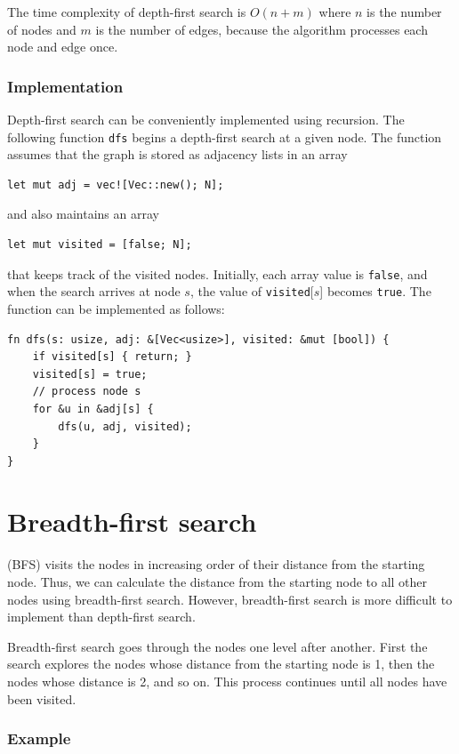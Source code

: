 The time complexity of depth-first search is $O(n+m)$
where $n$ is the number of nodes and $m$ is the
number of edges,
because the algorithm processes each node and edge once.

\subsubsection*{Implementation}

Depth-first search can be conveniently
implemented using recursion.
The following function \texttt{dfs} begins
a depth-first search at a given node.
The function assumes that the graph is
stored as adjacency lists in an array
\begin{lstlisting}
let mut adj = vec![Vec::new(); N];
\end{lstlisting}
and also maintains an array
\begin{lstlisting}
let mut visited = [false; N];
\end{lstlisting}
that keeps track of the visited nodes.
Initially, each array value is \texttt{false},
and when the search arrives at node $s$,
the value of \texttt{visited}[$s$] becomes \texttt{true}.
The function can be implemented as follows:
\begin{lstlisting}
fn dfs(s: usize, adj: &[Vec<usize>], visited: &mut [bool]) {
    if visited[s] { return; }
    visited[s] = true;
    // process node s
    for &u in &adj[s] {
        dfs(u, adj, visited);
    }
}
\end{lstlisting}

\section{Breadth-first search}


 (BFS) visits the nodes
in increasing order of their distance
from the starting node.
Thus, we can calculate the distance
from the starting node to all other
nodes using breadth-first search.
However, breadth-first search is more difficult
to implement than depth-first search.

Breadth-first search goes through the nodes
one level after another.
First the search explores the nodes whose
distance from the starting node is 1,
then the nodes whose distance is 2, and so on.
This process continues until all nodes
have been visited.

\subsubsection*{Example}

